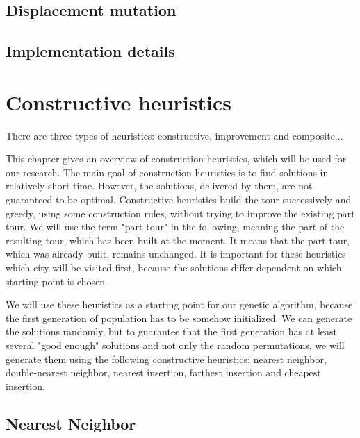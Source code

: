 \documentclass[a4paper, 12pt, headings=standardclasses]{scrartcl}
\begin{document}
\subsection{Displacement mutation}
\subsection{Implementation details}

\section{Constructive heuristics}

There are three types of heuristics: constructive, improvement and composite...

This chapter gives an overview of construction heuristics, which will be used for our research. The main goal of construction heuristics is to find solutions in relatively short time. However, the solutions, delivered by them, are not guaranteed to be optimal.  Constructive heuristics build the tour successively and greedy, using some construction rules, without trying to improve the existing part tour. We will use the term "part tour" in the following, meaning the part of the resulting tour, which has been built at the moment.  It means that the part tour, which was already built, remains unchanged. It is important for these heuristics which city will be visited first, because the solutions differ dependent on which starting point is chosen. \par
We will use these heuristics as a starting point for our genetic algorithm, because the first generation of population has to be somehow initialized. We can generate the solutions randomly, but to guarantee that the first generation has at least several "good enough" solutions and not only the random permutations, we will generate them using the following constructive heuristics: nearest neighbor, double-nearest neighbor, nearest insertion, farthest insertion and cheapest insertion.

\subsection{Nearest Neighbor}
\end{document}
